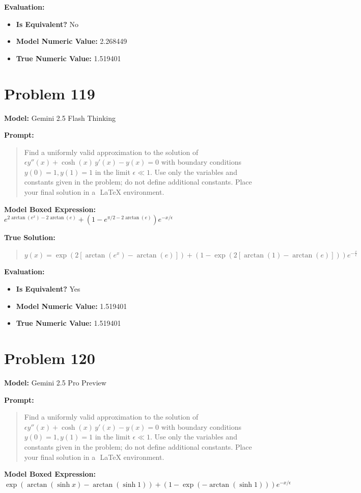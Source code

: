 \documentclass{article}
\begin{document}
{\textbf{Evaluation:}
\begin{itemize}
\item \textbf{Is Equivalent?} No
\item \textbf{Model Numeric Value:} 2.268449
\item \textbf{True Numeric Value:} 1.519401
\end{itemize}
\vspace{1cm}
\section*{Problem 119}
\textbf{Model:} Gemini 2.5 Flash Thinking

\textbf{Prompt:}
\begin{quote}
Find a uniformly valid approximation to the solution of $\epsilon y''(x) + \cosh(x)\,y'(x) - y(x) = 0$ with boundary conditions $y(0)=1, y(1)=1$ in the limit $\epsilon \ll 1$. Use only the variables and constants given in the problem; do not define additional constants. Place your final solution in a $\boxed{}$ LaTeX environment.
\end{quote}
\textbf{Model Boxed Expression:} $e^{2 \arctan(e^x) - 2 \arctan(e)} + (1 - e^{\pi/2 - 2 \arctan(e)})e^{-x/\epsilon}$

\textbf{True Solution:}
\begin{quote}
$y(x) = \exp (2[\arctan(e^x) - \arctan(e)]) + (1 - \exp (2[\arctan(1) - \arctan(e)]))e^{-\frac{x}{\epsilon}}$
\end{quote}

\textbf{Evaluation:}
\begin{itemize}
\item \textbf{Is Equivalent?} Yes
\item \textbf{Model Numeric Value:} 1.519401
\item \textbf{True Numeric Value:} 1.519401
\end{itemize}
\vspace{1cm}
\section*{Problem 120}
\textbf{Model:} Gemini 2.5 Pro Preview

\textbf{Prompt:}
\begin{quote}
Find a uniformly valid approximation to the solution of $\epsilon y''(x) + \cosh(x)\,y'(x) - y(x) = 0$ with boundary conditions $y(0)=1, y(1)=1$ in the limit $\epsilon \ll 1$. Use only the variables and constants given in the problem; do not define additional constants. Place your final solution in a $\boxed{}$ LaTeX environment.
\end{quote}
\textbf{Model Boxed Expression:} $\exp(\arctan(\sinh x) - \arctan(\sinh 1)) + (1 - \exp(-\arctan(\sinh 1)))e^{-x/\epsilon}$

}
\end{document}
